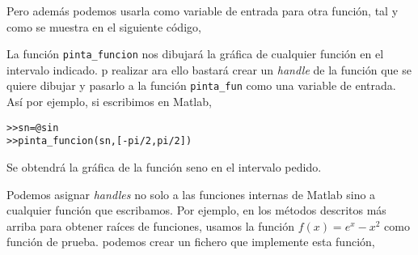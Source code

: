 Pero además podemos usarla como variable de entrada para otra función, tal y como se muestra en el siguiente código,





La función \texttt{pinta\_funcion} nos dibujará la gráfica de cualquier función en el intervalo indicado. p realizar ara ello bastará crear un \emph{handle} de la función que se quiere dibujar y pasarlo a la función \texttt{pinta\_fun} como una variable de entrada. Así por ejemplo, si escribimos en Matlab,

\begin{verbatim}
>>sn=@sin
>>pinta_funcion(sn,[-pi/2,pi/2])
\end{verbatim}

Se obtendrá la gráfica de la función seno en el intervalo pedido.

Podemos asignar \emph{handles} no solo a las funciones internas de Matlab sino a cualquier función que escribamos. Por ejemplo, en los métodos descritos más arriba para obtener raíces de funciones, usamos la función $f(x)=e^x-x^2$ como función de prueba. podemos crear un fichero que implemente esta función,

